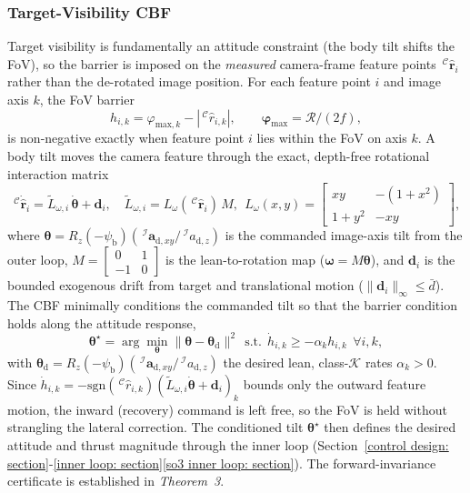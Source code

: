 \documentclass{IEEEtaes}
\begin{document}
\subsubsection{Target-Visibility CBF} \label{acceleration conditioning: section}
Target visibility is fundamentally an attitude constraint (the body tilt shifts the FoV), so the barrier is imposed on the \emph{measured} camera-frame feature points $\,^\mathcal{C}\hat{\boldsymbol{r}}_i$ rather than the de-rotated image position. For each feature point $i$ and image axis $k$, the FoV barrier
\begin{equation} \label{cbf barrier: equation}
    h_{i,k} = \varphi_{\text{max},k} - |\,^\mathcal{C}\hat{r}_{i,k}|,\qquad \boldsymbol{\varphi}_\text{max}=\mathcal{R}/(2f),
\end{equation}
is non-negative exactly when feature point $i$ lies within the FoV on axis $k$. A body tilt moves the camera feature through the exact, depth-free rotational interaction matrix
\begin{equation} \label{Lw: equation}
    \,^\mathcal{C}\dot{\hat{\boldsymbol{r}}}_i = \tilde{L}_{\omega,i}\,\dot{\boldsymbol{\theta}} + \boldsymbol{d}_i,\quad \tilde{L}_{\omega,i}=L_\omega(\,^\mathcal{C}\hat{\boldsymbol{r}}_i)\,M,\ \ L_\omega(x,y)=\begin{bmatrix} xy & -(1+x^2)\\ 1+y^2 & -xy\end{bmatrix},
\end{equation}
where $\boldsymbol{\theta}=R_z(-\psi_\text{b})(\,^\mathcal{I}\boldsymbol{a}_{\text{d},xy}/\,^\mathcal{I}a_{\text{d},z})$ is the commanded image-axis tilt from the outer loop, $M=[\begin{smallmatrix}0&1\\-1&0\end{smallmatrix}]$ is the lean-to-rotation map ($\boldsymbol{\omega}=M\boldsymbol{\theta}$), and $\boldsymbol{d}_i$ is the bounded exogenous drift from target and translational motion ($\|\boldsymbol{d}_i\|_\infty\le\bar{d}$). The CBF minimally conditions the commanded tilt so that the barrier condition holds along the attitude response,
\begin{equation} \label{cbf qp: equation}
    \boldsymbol{\theta}^\star=\arg\min_{\boldsymbol{\theta}}\|\boldsymbol{\theta}-\boldsymbol{\theta}_\text{d}\|^2\ \ \text{s.t.}\ \ \dot{h}_{i,k}\ge-\alpha_k h_{i,k}\ \ \forall i,k,
\end{equation}
with $\boldsymbol{\theta}_\text{d}=R_z(-\psi_\text{b})(\,^\mathcal{I}\boldsymbol{a}_{\text{d},xy}/\,^\mathcal{I}a_{\text{d},z})$ the desired lean, class-$\mathcal{K}$ rates $\alpha_k>0$. Since $\dot{h}_{i,k}=-\mathrm{sgn}(\,^\mathcal{C}\hat{r}_{i,k})(\tilde{L}_{\omega,i}\dot{\boldsymbol{\theta}}+\boldsymbol{d}_i)_k$ bounds only the outward feature motion, the inward (recovery) command is left free, so the FoV is held without strangling the lateral correction. The conditioned tilt $\boldsymbol{\theta}^\star$ then defines the desired attitude and thrust magnitude through the inner loop (Section~\ref{control design: section}-\ref{inner loop: section}\ref{so3 inner loop: section}). The forward-invariance certificate is established in \textit{Theorem~3}.
\end{document}
